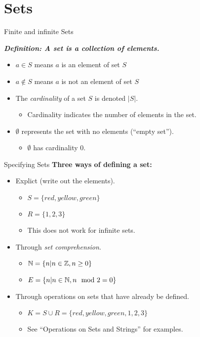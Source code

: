 \section[slide=true,tocsection=false]{Sets}

\begin{slide}[bm=,toc=]{Finite and infinite Sets}

\emph{\textbf{Definition: A set is a collection of elements.}}
\pause
\begin{itemize}
   \item<2-> $a \in S$ means $a$ is an element of set $S$ 
   \item<3-> $a \notin S$ means $a$ is not an element of set $S$
   \item<4-> The \emph{cardinality} of a set $S$ is denoted $|S|$. 
   \begin{itemize}
       \item<5-> Cardinality indicates the number of elements in the set.
   \end{itemize}
   \item<6-> $\emptyset$ represents the set with no elements (``empty set'').
   \begin{itemize}
       \item<7-> $\emptyset$ has cardinality 0. 
   \end{itemize}
\end{itemize} 
\end{slide}

\begin{slide}[bm=,toc=]{Specifying Sets}
\textbf{Three ways of defining a set:}
\begin{itemize}
   \item<2-> Explict (write out the elements).
   \begin{itemize}
      \item<3-> $S = \{red, yellow, green\}$ 
      \item<4-> $R = \{1,2,3\}$
      \item<5-> This does not work for infinite sets.
   \end{itemize} 
   \item<6-> Through \emph{set comprehension}. 
   \begin{itemize}
      \item<7-> $\mathbb{N} = \{n| n \in \mathbb{Z}, n \geq 0\}$ 
      \item<8-> $E = \{n| n \in \mathbb{N}, n \mod{2} = 0 \}$
   \end{itemize}
   \item<9-> Through operations on sets that have already be defined. 
   \begin{itemize}
      \item<10-> $K = S \cup R = \{red, yellow, green, 1, 2, 3\}$ 
      \item<11-> See ``Operations on Sets and Strings'' for examples. 
   \end{itemize}
\end{itemize} 

\end{slide}


